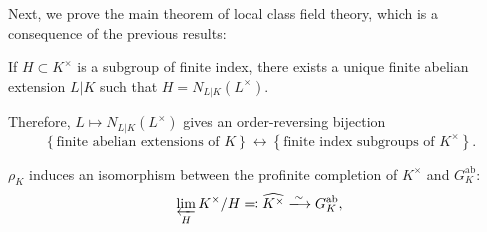\documentclass{article}
\begin{document}
Next, we prove the main theorem of local class field theory, which is a consequence of the previous results:
\begin{thm}\label{thm:existence}
		If $H\subset K^\times$ is a subgroup of finite index, there exists a unique finite abelian extension $L|K$ such that $H=N_{L|K}(L^\times)$.
		
		Therefore, $L\mapsto N_{L|K}(L^\times)$ gives an order-reversing bijection
		\[
			\left\{\text{finite abelian extensions of }K\right\} \longleftrightarrow \left\{\text{finite index subgroups of }K^\times\right\}.
		\]
\end{thm}
\begin{cor}
		$\rho_K$ induces an isomorphism between the profinite completion of $K^\times$ and $G_K^\text{ab}$:
		\[
			\varprojlim_H K^\times / H \eqqcolon \widehat{K^\times} \xlongrightarrow{\sim} G_K^\text{ab},	
		\]
\end{cor}
\end{document}
